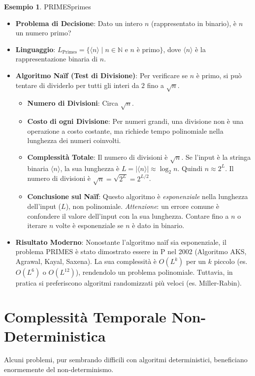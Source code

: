 \documentclass[a4paper]{article}
\theoremstyle{definition} %
\newtheorem{example}{Esempio}[section]
\begin{document}
\begin{example}{PRIMES}{primes}
\begin{itemize}
    \item \textbf{Problema di Decisione}: Dato un intero $n$ (rappresentato in binario), è $n$ un numero primo?
    \item \textbf{Linguaggio}: $L_{\text{Primes}} = \{ \langle n \rangle \mid n \in \mathbb{N} \text{ e } n \text{ è primo} \}$, dove $\langle n \rangle$ è la rappresentazione binaria di $n$.
    \item \textbf{Algoritmo Naïf (Test di Divisione)}: Per verificare se $n$ è primo, si può tentare di dividerlo per tutti gli interi da $2$ fino a $\sqrt{n}$.
        \begin{itemize}
            \item \textbf{Numero di Divisioni}: Circa $\sqrt{n}$.
            \item \textbf{Costo di ogni Divisione}: Per numeri grandi, una divisione non è una operazione a costo costante, ma richiede tempo polinomiale nella lunghezza dei numeri coinvolti.
            \item \textbf{Complessità Totale}: Il numero di divisioni è $\sqrt{n}$. Se l'input è la stringa binaria $\langle n \rangle$, la sua lunghezza è $L = |\langle n \rangle| \approx \log_2 n$. Quindi $n \approx 2^L$. Il numero di divisioni è $\sqrt{n} = \sqrt{2^L} = 2^{L/2}$.
            \item \textbf{Conclusione sul Naïf}: Questo algoritmo è \emph{esponenziale} nella lunghezza dell'input ($L$), non polinomiale. \emph{Attenzione}: un errore comune è confondere il valore dell'input con la sua lunghezza. Contare fino a $n$ o iterare $n$ volte è esponenziale se $n$ è dato in binario.
        \end{itemize}
    \item \textbf{Risultato Moderno}: Nonostante l'algoritmo naïf sia esponenziale, il problema PRIMES è stato dimostrato essere in P nel 2002 (Algoritmo AKS, Agrawal, Kayal, Saxena). La sua complessità è $O(L^k)$ per un $k$ piccolo (es. $O(L^6)$ o $O(L^{12})$), rendendolo un problema polinomiale. Tuttavia, in pratica si preferiscono algoritmi randomizzati più veloci (es. Miller-Rabin).
\end{itemize}
\end{example}

\section{Complessità Temporale Non-Deterministica}
Alcuni problemi, pur sembrando difficili con algoritmi deterministici, beneficiano enormemente del non-determinismo.
\end{document}
